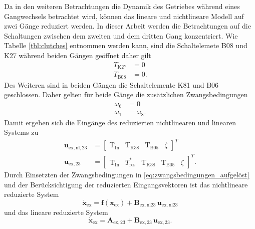 Da in den weiteren Betrachtungen die Dynamik des Getriebes während eines Gangwechsels betrachtet wird, können das lineare und nichtlineare Modell auf zwei Gänge reduziert werden. In dieser Arbeit werden die Betrachtungen auf die Schaltungen zwischen dem zweiten und dem dritten Gang konzentriert. Wie Tabelle \ref{tbl:clutches} entnommen werden kann, sind die Schaltelemete B08 und K27 während beiden Gängen geöffnet daher gilt  
\begin{subequations}
\begin{align*}
T_\mathrm{K27} &= 0 \\
T_\mathrm{B08} &= 0.
\end{align*}
\end{subequations}
Des Weiteren sind in beiden Gängen die Schaltelemente K81 und B06 geschlossen. Daher gelten für beide Gänge die zusätzlichen Zwangsbedingungen
\begin{subequations}
\begin{align}
\omega_6 &= 0\\
\omega_1 &= \omega_8.
\end{align}
\end{subequations}
Damit ergeben sich die Eingänge des reduzierten nichtlinearen und linearen Systems zu 
\begin{subequations}
\begin{align}
\pmb{u}_\mathrm{ex,nl,23} &= \begin{bmatrix} \mathrm{T}_{\mathrm{In}} & \mathrm{T}_{\mathrm{K38}} & \mathrm{T}_{\mathrm{B05}} & \zeta \end{bmatrix}^T\\
\pmb{u}_\mathrm{ex,23} &= \begin{bmatrix} \mathrm{T}_{\mathrm{In}} & T^*_\mathrm{res} & \mathrm{T}_{\mathrm{K38}} & \mathrm{T}_{\mathrm{B05}} & \zeta \end{bmatrix}^T.
\end{align}
\end{subequations}
Durch Einsetzten der Zwangsbedingungen in \eqref{eq:zwangsbedingungen_aufgelöst} und der Berücksichtigung der reduzierten Eingangsvektoren ist das nichtlineare reduzierte System
\begin{equation}
\dot{\pmb{x}}_\mathrm{ex} = \pmb{f}(\pmb{x}_\mathrm{ex}) + \pmb{B}_\mathrm{ex,nl23}\,\pmb{u}_\mathrm{ex,nl23}
\end{equation}
und das lineare reduzierte System 
\begin{equation}\label{eq:sys_ex23lin}
\dot{\pmb{x}}_\mathrm{ex} = \pmb{A}_\mathrm{ex,23} + \pmb{B}_\mathrm{ex,23}\,\pmb{u}_\mathrm{ex,23}.
\end{equation}

